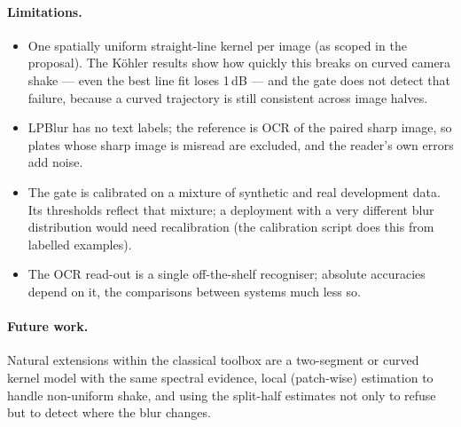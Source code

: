 \paragraph{Limitations.}
\begin{itemize}
  \item One spatially uniform straight-line kernel per image (as scoped in the proposal). The
        K\"ohler results show how quickly this breaks on curved camera shake --- even the best line
        fit loses 1\,dB --- and the gate does not detect that failure, because a curved trajectory
        is still consistent across image halves.
  \item LPBlur has no text labels; the reference is OCR of the paired sharp image, so plates whose
        sharp image is misread are excluded, and the reader's own errors add noise.
  \item The gate is calibrated on a mixture of synthetic and real development data. Its thresholds
        reflect that mixture; a deployment with a very different blur distribution would need
        recalibration (the calibration script does this from labelled examples).
  \item The OCR read-out is a single off-the-shelf recogniser; absolute accuracies depend on it, the
        comparisons between systems much less so.
\end{itemize}

\paragraph{Future work.} Natural extensions within the classical toolbox are a two-segment or
curved kernel model with the same spectral evidence, local (patch-wise) estimation to handle
non-uniform shake, and using the split-half estimates not only to refuse but to detect where the
blur changes.
